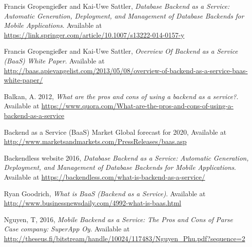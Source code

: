 \documentclass[a4paper]{article}
\begin{document}
    \begin{thebibliography}{9}
    	Francis Gropengießer and Kai-Uwe Sattler,
      \emph{Database Backend as a Service: Automatic Generation, Deployment, and Management of Database Backends for Mobile Applications}.
			Available at \underline{https://link.springer.com/article/10.1007/s13222-014-0157-y}
			
    	Francis Gropengießer and Kai-Uwe Sattler,
      \emph{Overview Of Backend as a Service (BaaS) White Paper}.
			Available at \underline{http://baas.apievangelist.com/2013/05/08/overview-of-backend-as-a-service-baas-white-paper/}
			
						
		
			Balkan, A. 2012,
      \emph{What are the pros and cons of using a backend as a service?}.
			Available at \underline{https://www.quora.com/What-are-the-pros-and-cons-of-using-a-backend-as-a-service}			
		
			Backend as a Service (BaaS) Market Global forecast for 2020,
			Available at \underline{http://www.marketsandmarkets.com/PressReleases/baas.asp}		
		
			Backendless website 2016,
      \emph{Database Backend as a Service: Automatic Generation, Deployment, and Management of Database Backends for Mobile Applications}.
			Available at \underline{https://backendless.com/what-is-backend-as-a-service/}
	

			Ryan Goodrich,
      \emph{What is BaaS (Backend as a Service)}.
			Available at \underline{http://www.businessnewsdaily.com/4992-what-is-baas.html}	
			
			Nguyen, T, 2016,
      \emph{Mobile Backend as a Service: The Pros and Cons of Parse
			Case company: SuperApp Oy}.
			Available at \underline{http://theseus.fi/bitstream/handle/10024/117483/Nguyen{\_}Phu.pdf?sequence=2}
		
		\end{thebibliography}	
    
\end{document}
